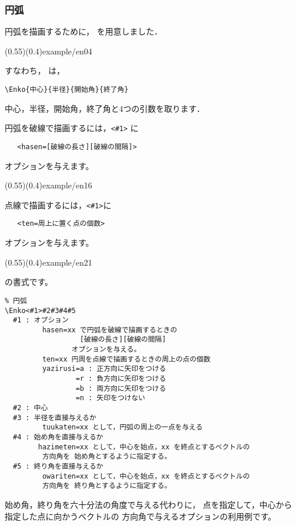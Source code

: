 \subsubsection{円弧}
円弧を描画するために， を用意しました．

(0.55)(0.4){example/en04}

すなわち， は，
\begin{jquote}
\begin{verbatim}
\Enko{中心}{半径}{開始角}{終了角}
\end{verbatim}
\end{jquote}
中心，半径，開始角，終了角と4つの引数を取ります．
\bigskip

円弧を破線で描画するには，\verb/<#1>/ に
\begin{verbatim}
   <hasen=[破線の長さ][破線の間隔]>
\end{verbatim}
オプションを与えます。

\showexample[円弧を破線で](0.55)(0.4){example/en16}

点線で描画するには，\verb/<#1>/に
\begin{verbatim}
   <ten=周上に置く点の個数>
\end{verbatim}
オプションを与えます。

\showexample[円弧を点線で](0.55)(0.4){example/en21}

の書式です。

\begin{boxnote}
\begin{verbatim}
% 円弧
\Enko<#1>#2#3#4#5
  #1 : オプション
         hasen=xx で円弧を破線で描画するときの
                  [破線の長さ][破線の間隔]
                オプションを与える。
         ten=xx 円周を点線で描画するときの周上の点の個数
         yazirusi=a : 正方向に矢印をつける
                 =r : 負方向に矢印をつける
                 =b : 両方向に矢印をつける
                 =n : 矢印をつけない
  #2 : 中心
  #3 : 半径を直接与えるか
         tuukaten=xx として，円弧の周上の一点を与える
  #4 : 始め角を直接与えるか
        hazimeten=xx として，中心を始点，xx を終点とするベクトルの
         方向角を 始め角とするように指定する。
  #5 : 終り角を直接与えるか
         owariten=xx として，中心を始点，xx を終点とするベクトルの
         方向角を 終り角とするように指定する。
\end{verbatim}
\end{boxnote}

始め角，終り角を六十分法の角度で与える代わりに，
点を指定して，中心から指定した点に向かうベクトルの
方向角で与えるオプションの利用例です。

